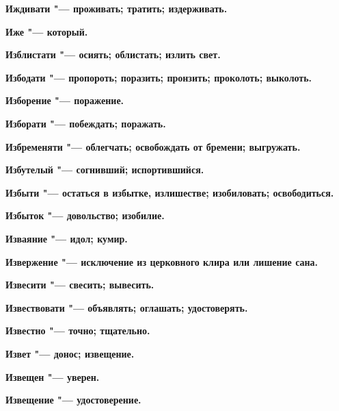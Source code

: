 \bfseries Иждивати \normalfont{} "--- проживать; тратить; издерживать. 




\bfseries Иже \normalfont{} "--- который. 




\bfseries Изблистати \normalfont{} "--- осиять; облистать; излить свет. 




\bfseries Избодати \normalfont{} "--- пропороть; поразить; пронзить; проколоть; выколоть. 




\bfseries Изборение \normalfont{} "--- поражение. 




\bfseries Изборати \normalfont{} "--- побеждать; поражать. 




\bfseries Избременяти \normalfont{} "--- облегчать; освобождать от бремени; выгружать. 




\bfseries Избутелый \normalfont{} "--- согнивший; испортившийся. 




\bfseries Избыти \normalfont{} "--- остаться в избытке, излишестве; изобиловать; освободиться. 




\bfseries Избыток \normalfont{} "--- довольство; изобилие. 




\bfseries Изваяние \normalfont{} "--- идол; кумир. 




\bfseries Извержение \normalfont{} "--- исключение из церковного клира или лишение сана. 




\bfseries Извесити \normalfont{} "--- свесить; вывесить. 




\bfseries Извествовати \normalfont{} "--- объявлять; оглашать; удостоверять. 




\bfseries Известно \normalfont{} "--- точно; тщательно. 




\bfseries Извет \normalfont{} "--- донос; извещение. 




\bfseries Извещен \normalfont{} "--- уверен. 




\bfseries Извещение \normalfont{} "--- удостоверение. 




